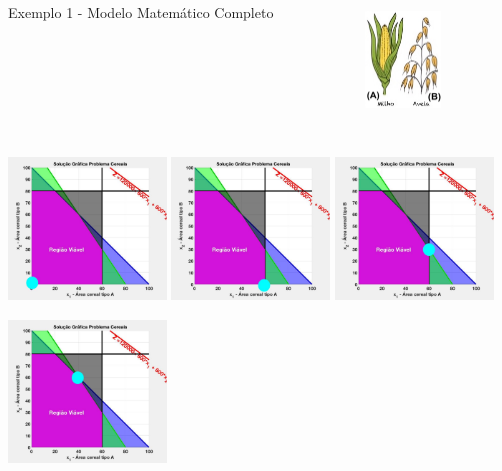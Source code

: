 \begin{frame}
{\begin{columns}
\begin{column}{0.7\textwidth}
\begin{exampleblock}{Exemplo 1 - Modelo Matemático Completo}
				\end{exampleblock}
			\end{column}
			\begin{column}{0.3\textwidth}
				\centering
				\includegraphics[width=2cm,height=3cm]{milho_aveia2.png}
			\end{column}
		\end{columns}
	}
	{
		\centering
		\includegraphics[width=4.2cm,height=4.2cm]{Exaustiva_2.jpeg}
	}
	\only<4>
	{
		\centering
		\includegraphics[width=4.2cm,height=4.2cm]{Exaustiva_3.jpeg}
	}
	\only<5>
	{
		\centering
		\includegraphics[width=4.2cm,height=4.2cm]{Exaustiva_4.jpeg}
	}
	\only<6>
	{
		\centering
		\includegraphics[width=4.2cm,height=4.2cm]{Exaustiva_5.jpeg}
}
\end{frame}
